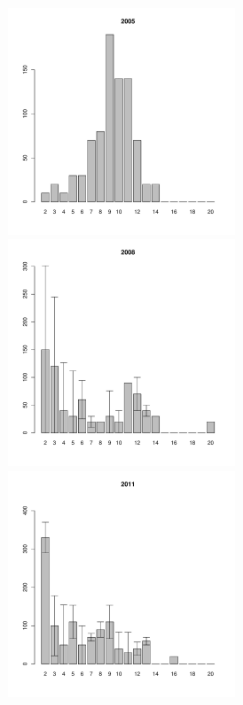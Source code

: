 \begin{figure}[hp]
\begin{minipage}[b]{.3\linewidth}
\begin{center}
	\end{center}
	\end{minipage}
	\begin{minipage}[b]{.3\linewidth}
	\begin{center}
	\includegraphics[width=60mm]{../White_Sea/Luvenga_Goreliy/low2_2005_.pdf}
	\end{center}
	\end{minipage}
	\hfill	
	\begin{minipage}[b]{.3\linewidth}
	\begin{center}
	\includegraphics[width=60mm]{../White_Sea/Luvenga_Goreliy/low2_2008_.pdf}
	\end{center}
	\end{minipage}
	\hfill
	\begin{minipage}[b]{.3\linewidth}
	\begin{center}
	\includegraphics[width=60mm]{../White_Sea/Luvenga_Goreliy/low2_2011_.pdf}

\end{center}
\end{minipage}
\end{figure}
